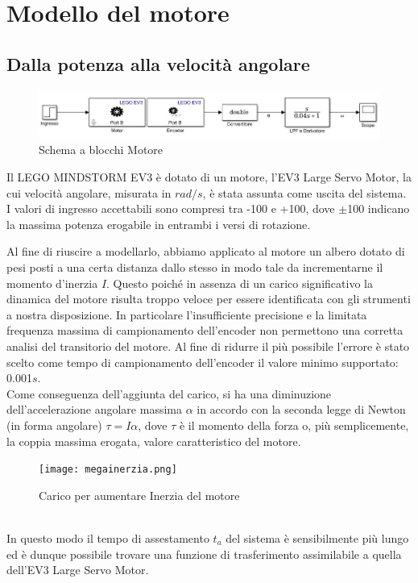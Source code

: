 \chapter{Modello del motore}\label{modMotor}
\section{Dalla potenza alla velocità angolare}
\begin{figure}[ht]
	\centering
	\includegraphics[width=\textwidth]{motoreSimulink.jpg}
	\caption{Schema a blocchi Motore}
	\label{motoreSimulink}
\end{figure}
Il LEGO MINDSTORM EV3 è dotato di un motore, l'EV3 Large Servo Motor, la cui velocità angolare, misurata in $rad/s$, è stata assunta come uscita del sistema.\\
I valori di ingresso accettabili sono compresi tra -100 e +100, dove $\pm$100 indicano la massima potenza erogabile in entrambi i versi di rotazione.

Al fine di riuscire a modellarlo, abbiamo applicato al motore un albero dotato di pesi posti a una certa distanza dallo stesso in modo tale da incrementarne il momento d'inerzia $I$. Questo poiché in assenza di un carico significativo la dinamica del motore risulta  troppo veloce per  essere identificata con gli strumenti a nostra disposizione. In particolare l'insufficiente precisione e la limitata frequenza massima di campionamento dell'encoder non permettono una corretta analisi del transitorio del motore. Al fine di ridurre il più possibile l'errore è stato scelto come tempo di campionamento dell'encoder il valore minimo supportato: 0.001$s$.\\
Come conseguenza dell'aggiunta del carico, si ha una diminuzione dell'accelerazione angolare massima $\alpha$ in accordo con la seconda legge di Newton (in forma angolare) $\tau = I\alpha$, dove $\tau$ è il momento della forza o, più semplicemente, la coppia massima erogata, valore caratteristico del motore.
\begin{figure}[ht]
	\centering
	\texttt{[image: megainerzia.png]}
	\caption{Carico per aumentare Inerzia del motore}
	\label{megainerzia}
\end{figure}
\\In questo modo il tempo di assestamento $t_a$ del sistema è sensibilmente più lungo ed è dunque possibile trovare una funzione di trasferimento assimilabile a quella dell'EV3 Large Servo Motor.

